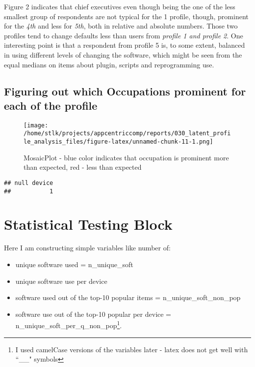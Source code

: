 \documentclass[]{article}
\providecommand{\tightlist}{%
  \setlength{\itemsep}{0pt}\setlength{\parskip}{0pt}}
\let\rmarkdownfootnote\footnote%
\def\footnote{\protect\rmarkdownfootnote}
\begin{document}
Figure 2 indicates that chief executives even though being the one of
the less smallest group of respondents are not typical for the 1
profile, though, prominent for the \emph{4th} and less for \emph{5th},
both in relative and absolute numbers. Those two profiles tend to change
defaults less than users from \emph{profile 1 and profile 2}. One
interesting point is that a respondent from profile 5 is, to some
extent, balanced in using different levels of changing the software,
which might be seen from the equal medians on items about plugin,
scripts and reprogramming use.

\subsection{Figuring out which Occupations prominent for each of the
profile}\label{figuring-out-which-occupations-prominent-for-each-of-the-profile}

\begin{figure}[htbp]
\centering
\texttt{[image: /home/stlk/projects/appcentriccomp/reports/030\_latent\_profile\_analysis\_files/figure-latex/unnamed-chunk-11-1.png]}
\caption{MosaicPlot - blue color indicates that occupation is prominent
more than expected, red - less than expected}
\end{figure}

\begin{verbatim}
## null device 
##           1
\end{verbatim}

\section{Statistical Testing Block}\label{statistical-testing-block}

Here I am constructing simple variables like number of:

\begin{itemize}
\tightlist
\item
  unique software used = n\_unique\_soft
\item
  unique software use per device\\
\item
  software used out of the top-10 popular items =
  n\_unique\_soft\_non\_pop
\item
  software use out of the top-10 popular per device =
  n\_unique\_soft\_per\_q\_non\_pop\footnote{I used camelCase versions
    of the variables later - latex does not get well with ``\_\_"
    symbols}.
\end{itemize}
\end{document}
